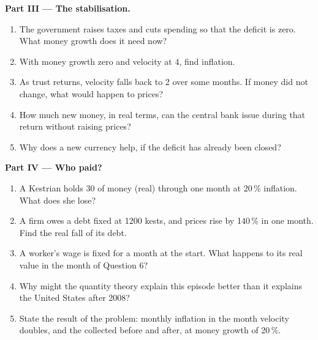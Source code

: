 \begin{problem}
\medskip
\noindent\textbf{Part III --- The stabilisation.}
\begin{enumerate}[resume]
\item The government raises taxes and cuts spending so that the deficit is zero. What money growth does it need now?
\item With money growth zero and velocity at 4, find inflation.
\item As trust returns, velocity falls back to 2 over some months. If money did not change, what would happen to prices?
\item How much new money, in real terms, can the central bank issue during that return without raising prices?
\item Why does a new currency help, if the deficit has already been closed?
\end{enumerate}

\medskip
\noindent\textbf{Part IV --- Who paid?}
\begin{enumerate}[resume]
\item A Kestrian holds 30 of money (real) through one month at 20\,\% inflation. What does she lose?
\item A firm owes a debt fixed at 1200 kests, and prices rise by 140\,\% in one month. Find the real fall of its debt.
\item A worker's wage is fixed for a month at the start. What happens to its real value in the month of Question 6?
\item Why might the quantity theory explain this episode better than it explains the United States after 2008?
\item State the result of the problem: monthly inflation in the month velocity doubles, and the  collected before and after, at money growth of 20\,\%.
\end{enumerate}
\end{problem}
